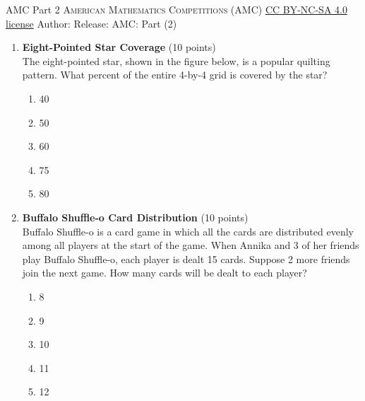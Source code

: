 \newpage\handout
{AMC Part 2}
{\textsc{American Mathematics Competitions (AMC)}}
{\href{https://creativecommons.org/licenses/by-nc-sa/4.0/}{CC BY-NC-SA 4.0 license}}
{Author: \BookAuthor}{Release: \generatedOn}
{AMC: Part (2)}






\begin{enumerate}
  \item \textbf{Eight-Pointed Star Coverage} (10 points)\\
  The eight-pointed star, shown in the figure below, is a 
  popular quilting pattern. What percent of the entire 
  4-by-4 grid is covered by the star?
  \begin{enumerate}[label=(\Alph*)]
    \item 40
    \item 50
    \item 60
    \item 75
    \item 80
  \end{enumerate}
  \begin{subanswer}
  \end{subanswer}

  \item \textbf{Buffalo Shuffle-o Card Distribution} (10 points)\\
  Buffalo Shuffle-o is a card game in which all the cards are distributed evenly among all players at the start of the game. When Annika and 3 of her friends play Buffalo Shuffle-o, each player is dealt 15 cards. Suppose 2 more friends join the next game. How many cards will be dealt to each player?
  \begin{enumerate}[label=(\Alph*)]
    \item 8
    \item 9
    \item 10
    \item 11
    \item 12
  \end{enumerate}
  \begin{subanswer}
  \end{subanswer}

  \newpage


\end{enumerate}
